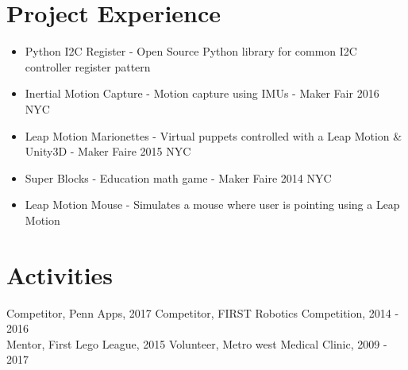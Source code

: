 \documentclass[10pt]{article}
\begin{document}
\begin{flushleft}
\section{Project Experience}
	\begin{itemize}
		\item Python I2C Register - Open Source Python library for common I2C controller register pattern
		\item Inertial Motion Capture - Motion capture using IMUs - Maker Fair 2016 NYC
		\item Leap Motion Marionettes - Virtual puppets controlled with a Leap Motion \& Unity3D - Maker Faire 2015 NYC
		\item Super Blocks - Education math game - Maker Faire 2014 NYC
		\item Leap Motion Mouse - Simulates a mouse where user is pointing using a Leap Motion
	\end{itemize}

\section{Activities}
	Competitor, Penn Apps, 2017 \hfill Competitor, FIRST Robotics Competition, 2014 - 2016 \\
	Mentor, First Lego League, 2015 \hfill Volunteer, Metro west Medical Clinic, 2009 - 2017

\end{flushleft}
\end{document}

